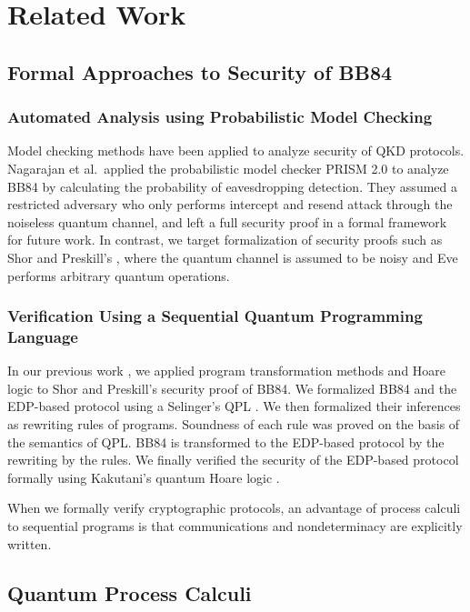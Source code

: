 \section{Related Work}
\subsection{Formal Approaches to Security of BB84}
\subsubsection{Automated Analysis using Probabilistic Model Checking}
Model checking methods have been applied to analyze security 
of QKD protocols.
Nagarajan et al.\ applied the probabilistic model checker
PRISM 2.0 \cite{KwiatkowskaNormanParker2004}
to analyze BB84 \cite{NagarajanPapanikolaouBowenGay2005}
by calculating
the probability of eavesdropping detection. They assumed a
restricted adversary who only performs intercept and resend attack
through the noiseless quantum channel, and left a full security 
proof in a formal framework for future work.
In contrast, we target 
formalization of security proofs such as Shor and Preskill's
\cite{ShorPreskill2000}, where the quantum channel is assumed to be
noisy and Eve performs arbitrary quantum operations.

\subsubsection{Verification Using a Sequential Quantum Programming Language}
In our previous work \cite{KubotaKakutaniKatoKawono2011}, we applied
program transformation methods and Hoare logic to
Shor and Preskill's security proof of BB84.
We formalized BB84 and the EDP-based protocol using a
Selinger's QPL \cite{Selinger2004}.
We then formalized their inferences
as rewriting rules of programs. Soundness of each rule was
proved on the basis of the semantics of QPL.
BB84 is transformed to the EDP-based protocol by the rewriting by
the rules.
We finally verified the security of the EDP-based protocol formally
using Kakutani's quantum Hoare logic \cite{Kakutani2009}.

When we formally verify cryptographic protocols,
an advantage of process calculi to sequential programs is that
communications and nondeterminacy are explicitly written.

\subsection{Quantum Process Calculi}
